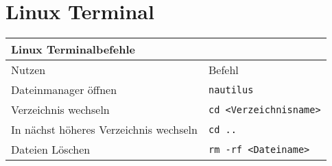 \documentclass[12pt]{scrartcl}%
\theoremstyle{nonumberplain}
\begin{document}
\section{Linux Terminal}
\begin{tabular}{ll} 
\toprule
\textbf{Linux Terminalbefehle}\\  
\midrule 
Nutzen & Befehl\\ 
\midrule 
Dateinmanager öffnen & \texttt{nautilus}\\
Verzeichnis wechseln & \texttt{cd <Verzeichnisname>}\\
In nächst höheres Verzeichnis wechseln & \texttt{cd ..}\\
Dateien Löschen & \texttt{rm -rf <Dateiname>} \\
\bottomrule
\end{tabular}
\end{document}
